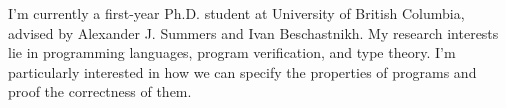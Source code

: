 \documentclass[12pt,letterpaper]{report}
\newcommand{\listitemspace}{0.15em}
\renewenvironment{itemize}
{\begin{list}{}{\setlength{\leftmargin}{0em}
			\setlength{\parskip}{0em}
			\setlength{\itemsep}{\listitemspace}
			\setlength{\parsep}{\listitemspace}}}
	{\end{list}}
\begin{document}
\begin{itemize}



	\item I'm currently a first-year Ph.D. student at University of British Columbia, advised by Alexander J. Summers and Ivan Beschastnikh.
	      My research interests lie in programming languages, program verification, and type theory. I'm particularly interested in how we can specify the properties of programs and proof the correctness of them.

\end{itemize}

\end{document}
